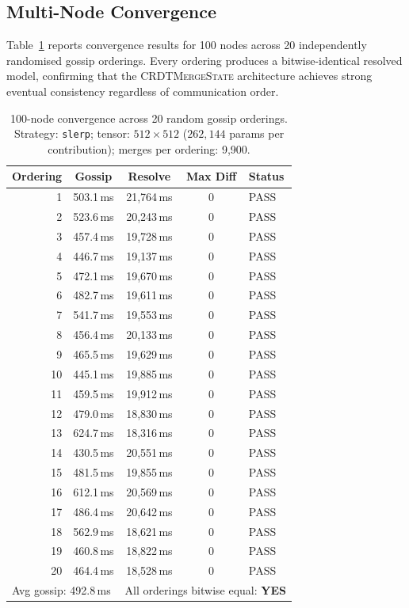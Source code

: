 \documentclass[10pt,letterpaper]{article}
\newcommand{\CMS}{\texorpdfstring{{\mdseries\upshape\textsc{CRDTMergeState}}}{CRDTMergeState}}
\begin{document}
\subsection{Multi-Node Convergence}

Table~\ref{tab:convergence} reports convergence results for 100 nodes across 20 independently randomised gossip orderings.
Every ordering produces a bitwise-identical resolved model, confirming that the \CMS{} architecture achieves strong eventual consistency regardless of communication order.

\begin{table}[htbp]
\centering
\caption{100-node convergence across 20 random gossip orderings.
Strategy: \texttt{slerp}; tensor: $512\times 512$ ($262{,}144$ params per contribution); merges per ordering: 9{,}900.}
\label{tab:convergence}
\footnotesize
\begin{tabular}{rcccl}
\toprule
Ordering & Gossip & Resolve & Max Diff & Status \\
\midrule
1 & 503.1\,ms & 21{,}764\,ms & 0 & PASS \\
2 & 523.6\,ms & 20{,}243\,ms & 0 & PASS \\
3 & 457.4\,ms & 19{,}728\,ms & 0 & PASS \\
4 & 446.7\,ms & 19{,}137\,ms & 0 & PASS \\
5 & 472.1\,ms & 19{,}670\,ms & 0 & PASS \\
6 & 482.7\,ms & 19{,}611\,ms & 0 & PASS \\
7 & 541.7\,ms & 19{,}553\,ms & 0 & PASS \\
8 & 456.4\,ms & 20{,}133\,ms & 0 & PASS \\
9 & 465.5\,ms & 19{,}629\,ms & 0 & PASS \\
10 & 445.1\,ms & 19{,}885\,ms & 0 & PASS \\
11 & 459.5\,ms & 19{,}912\,ms & 0 & PASS \\
12 & 479.0\,ms & 18{,}830\,ms & 0 & PASS \\
13 & 624.7\,ms & 18{,}316\,ms & 0 & PASS \\
14 & 430.5\,ms & 20{,}551\,ms & 0 & PASS \\
15 & 481.5\,ms & 19{,}855\,ms & 0 & PASS \\
16 & 612.1\,ms & 20{,}569\,ms & 0 & PASS \\
17 & 486.4\,ms & 20{,}642\,ms & 0 & PASS \\
18 & 562.9\,ms & 18{,}621\,ms & 0 & PASS \\
19 & 460.8\,ms & 18{,}822\,ms & 0 & PASS \\
20 & 464.4\,ms & 18{,}528\,ms & 0 & PASS \\
\midrule
\multicolumn{2}{l}{Avg gossip: 492.8\,ms} & \multicolumn{3}{l}{All orderings bitwise equal: \textbf{YES}} \\
\bottomrule
\end{tabular}
\end{table}
\end{document}
